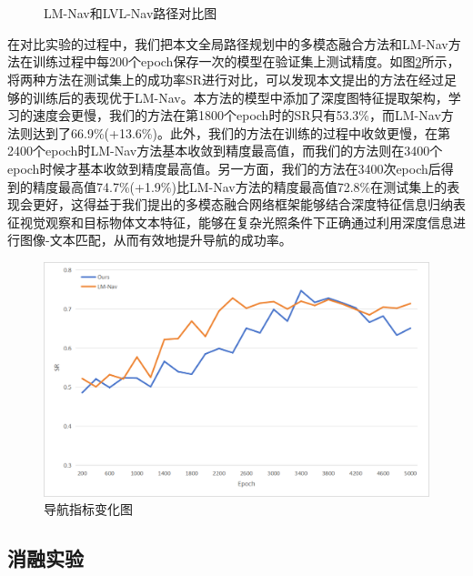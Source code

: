 \begin{figure}[htbp]
    \centering
    \\
    \\
    \caption{LM-Nav和LVL-Nav路径对比图}
    \label{LM-NavcmpLVL-Nav}
\end{figure}
    
在对比实验的过程中，我们把本文全局路径规划中的多模态融合方法和LM-Nav方法在训练过程中每200个epoch保存一次的模型在验证集上测试精度。如图\ref{curvecmp}所示，将两种方法在测试集上的成功率SR进行对比，可以发现本文提出的方法在经过足够的训练后的表现优于LM-Nav。本方法的模型中添加了深度图特征提取架构，学习的速度会更慢，我们的方法在第1800个epoch时的SR只有53.3\%，而LM-Nav方法则达到了66.9\%(+13.6\%)。此外，我们的方法在训练的过程中收敛更慢，在第2400个epoch时LM-Nav方法基本收敛到精度最高值，而我们的方法则在3400个epoch时候才基本收敛到精度最高值。另一方面，我们的方法在3400次epoch后得到的精度最高值74.7\%(+1.9\%)比LM-Nav方法的精度最高值72.8\%在测试集上的表现会更好，这得益于我们提出的多模态融合网络框架能够结合深度特征信息归纳表征视觉观察和目标物体文本特征，能够在复杂光照条件下正确通过利用深度信息进行图像-文本匹配，从而有效地提升导航的成功率。

\begin{figure}[htbp]
    \centering
    \includegraphics[scale=0.70]{Fig/curvecmp.png}
    \caption{\label{curvecmp}导航指标变化图}
\end{figure}


\subsection{消融实验}

